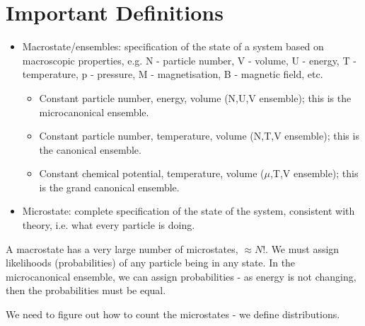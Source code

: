 \documentclass[a4paper, 11pt, normalem]{report}
\begin{document}
\section{Important Definitions}
\begin{itemize}
    \item Macrostate/ensembles: specification of the state of a system based on macroscopic properties, e.g. N - particle number, V - volume, U - energy, T - temperature, p - pressure, M - magnetisation, B - magnetic field, etc.
        \begin{itemize}
            \item Constant particle number, energy, volume (N,U,V ensemble); this is the microcanonical ensemble.
            \item Constant particle number, temperature, volume (N,T,V ensemble); this is the canonical ensemble.
            \item Constant chemical potential, temperature, volume ($\mu$,T,V ensemble); this is the grand canonical ensemble.
        \end{itemize}
    \item Microstate: complete specification of the state of the system, consistent with theory, i.e. what every particle is doing.
\end{itemize}
A macrostate has a very large number of microstates, $\approx N!$.
We must assign likelihoods (probabilities) of any particle being in any state.
In the microcanonical ensemble, we can assign probabilities - as energy is not changing, then the probabilities must be equal.

We need to figure out how to count the microstates - we define distributions.
\end{document}
